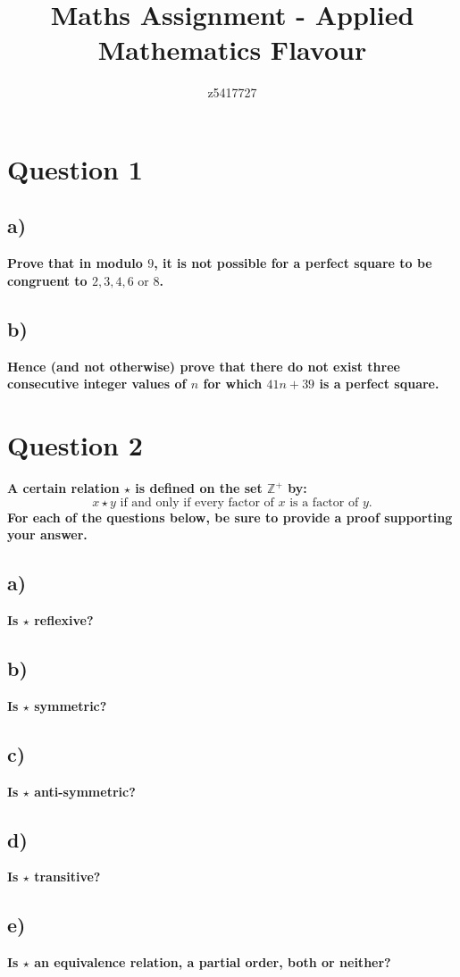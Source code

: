 \documentclass{article}
\title{Maths Assignment - Applied Mathematics Flavour}
\author{z5417727}
\begin{document}
\maketitle
{\LARGE \tableofcontents}
\newpage
\section{Question 1}
\subsection{a)}
\textbf{ Prove that in modulo $9$, it is not possible for a perfect square to be congruent to $2, 3, 4, 6 \text{ or } 8$.}
\newpage
\subsection{b)}
\textbf{ Hence (and not otherwise) prove that there do not exist three consecutive integer values of $n$ for which $41n + 39$ is a perfect square. }
\newpage
\section{Question 2}
\textbf{ A certain relation $\star$ is defined on the set $\mathbb{Z}^+$ by:
\newline
$$x \star y \text{ if and only if every factor of } x \text{ is a factor of } y.$$
For each of the questions below, be sure to provide a proof supporting your answer. }
\subsection{a)}
\textbf{ Is $\star $ reflexive? }
\newpage
\subsection{b)}
\textbf{Is $\star $ symmetric?}
\newpage
\subsection{c)}
\textbf{Is $\star $ anti-symmetric? }
\newpage
\subsection{d)}
\textbf{ Is $\star $ transitive?}
\newpage
\subsection{e)}
\textbf{ Is $\star $ an equivalence relation, a partial order, both or neither?}
\newpage
\end{document}

